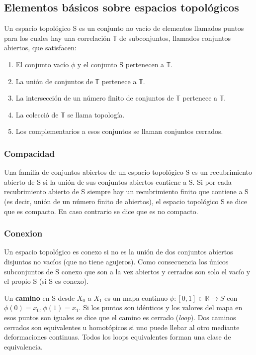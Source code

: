 \documentclass{article}
\begin{document}
\subsection{Elementos básicos sobre espacios topológicos}

Un espacio topológico S es un conjunto no vacío de elementos llamados puntos para los cuales hay una correlación $\mathds{T}$ de subconjuntos, llamados conjuntos abiertos, que satisfacen:

\begin{enumerate}
\item El conjunto vacío $\phi$ y el conjunto S pertenecen a $\mathds{T}$.
\item La unión de conjuntos de $\mathds{T}$ pertenece a $\mathds{T}$.
\item La intersección de un número finito de conjuntos de $\mathds{T}$ pertenece a $\mathds{T}$.
\item La colecció de $\mathds{T}$ se llama topología.
\item Los complementarios a esos conjuntos se llaman conjuntos cerrados.
\end{enumerate}

\subsubsection{Compacidad}

Una familia de conjuntos abiertos de un espacio topológico S es un recubrimiento abierto de S si la unión de sus conjuntos abiertos contiene a S. Si por cada recubrimiento abierto de S siempre hay un recubrimiento finito que contiene a S (es decir, unión de un número finito de abiertos), el espacio topológico S se dice que es compacto. En caso contrario se dice que es no compacto.

\subsubsection{Conexion}

Un espacio topológico es conexo si no es la unión de dos conjuntos abiertos disjuntos no vacíos (que no tiene agujeros). Como consecuencia los únicos subconjuntos de S conexo que son a la vez abiertos y cerrados son solo el vacío y el propio S (si S es conexo).

\smallskip
Un \textbf{camino} en S desde $X_0$ a $X_1$  es un mapa continuo  $\phi: [0,1]\in \mathds{R}\to S$ con $\phi (0)=x_0,\phi (1)=x_1$. Si los puntos son idénticos y los valores del mapa en esos puntos son iguales se dice que el camino es cerrado (\textit{loop}). Dos caminos cerrados son equivalentes u homotópicos si uno puede llebar al otro mediante deformaciones continuas. Todos los loops equivalentes forman una clase de equivalencia.
\end{document}
